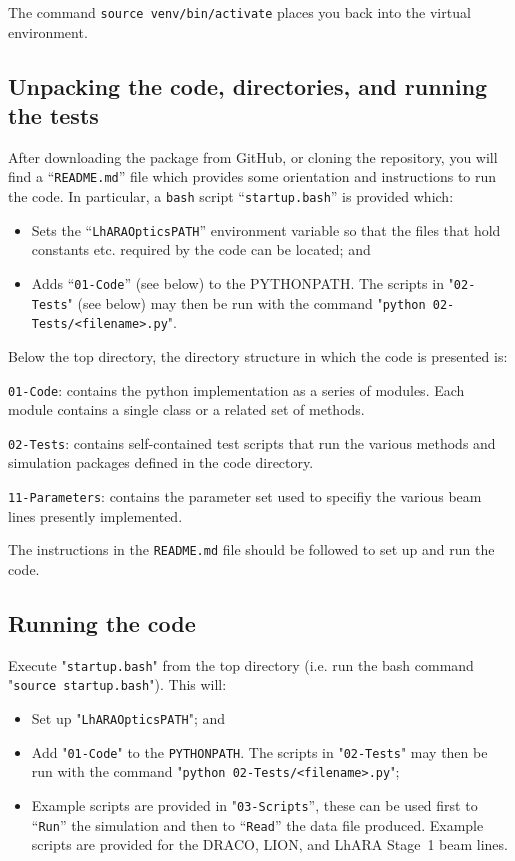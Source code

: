 The command \verb+source venv/bin/activate+ places you back
into the virtual environment.

\subsection{Unpacking the code, directories, and running the tests}
After downloading the package from GitHub, or cloning the repository,
you will find a ``\verb+README.md+'' file which provides some orientation
and instructions to run the code.
In particular, a \verb+bash+ script ``\verb+startup.bash+'' is
provided which:
\begin{itemize}
  \item Sets the ``\verb+LhARAOpticsPATH+'' environment variable
    so that the files that hold constants etc. required by the code
    can be located; and
  \item Adds ``\verb+01-Code+'' (see below) to the PYTHONPATH.
    The scripts in "\verb+02-Tests+" (see below) may then be run with
    the command "\verb+python 02-Tests/<filename>.py+".
\end{itemize}
Below the top directory, the directory structure in which the code is
presented is:
\begin{description}
  \item\verb+01-Code+: contains the python implementation as a
    series of modules.
    Each module contains a single class or a related set of methods.
  \item\verb+02-Tests+: contains self-contained test scripts that
    run the various methods and simulation packages defined in the
    code directory.
  \item\verb+11-Parameters+: contains the parameter set used to 
    specifiy the various beam lines presently implemented.
\end{description}
The instructions in the \verb+README.md+ file should be followed to set
up and run the code.

\subsection{Running the code}
Execute "\verb+startup.bash+" from the top directory (i.e. run the
bash command "\verb+source startup.bash+").  This will:
\begin{itemize}
  \item Set up "\verb+LhARAOpticsPATH+"; and
  \item Add "\verb+01-Code+" to the \verb+PYTHONPATH+.
    The scripts in "\verb+02-Tests+" may then be run with the command
    "\verb+python 02-Tests/<filename>.py+"; 
  \item Example scripts are provided in "\verb+03-Scripts+'', these
    can be used first to ``\verb+Run+'' the simulation and then to
    ``\verb+Read+'' the data file produced.
    Example scripts are provided for the DRACO, LION, and LhARA
    Stage~1 beam lines.
\end{itemize}


